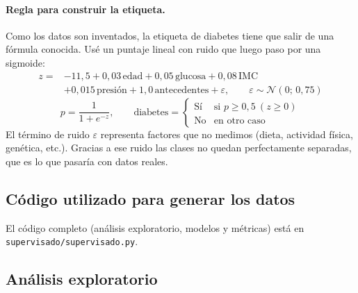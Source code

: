 \documentclass[11pt,letterpaper]{article}
\begin{document}
\paragraph{Regla para construir la etiqueta.} Como los datos son inventados, la etiqueta de diabetes tiene que
salir de una fórmula conocida. Usé un puntaje lineal con ruido que luego paso por una sigmoide:
\begin{equation}
\begin{split}
z = {} & -11{,}5 + 0{,}03\,\text{edad} + 0{,}05\,\text{glucosa} + 0{,}08\,\text{IMC} \\
       & + 0{,}015\,\text{presión} + 1{,}0\,\text{antecedentes} + \varepsilon, \qquad \varepsilon \sim \mathcal{N}(0;\,0{,}75)
\end{split}
\end{equation}
\begin{equation}
p = \frac{1}{1+e^{-z}}, \qquad
\text{diabetes} = \begin{cases} \text{Sí} & \text{si } p \ge 0{,}5 \ (z \ge 0)\\ \text{No} & \text{en otro caso} \end{cases}
\end{equation}
El término de ruido $\varepsilon$ representa factores que no medimos (dieta, actividad física, genética,
etc.). Gracias a ese ruido las clases no quedan perfectamente separadas, que es lo que pasaría con datos reales.

\subsection{Código utilizado para generar los datos}



El código completo (análisis exploratorio, modelos y métricas) está en \texttt{supervisado/supervisado.py}.

\subsection{Análisis exploratorio}
\end{document}
